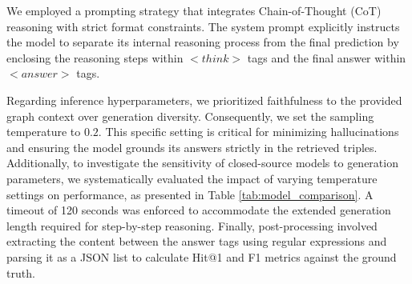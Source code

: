 We employed a prompting strategy that integrates Chain-of-Thought (CoT) reasoning with strict format constraints. The system prompt explicitly instructs the model to separate its internal reasoning process from the final prediction by enclosing the reasoning steps within $<think>$ tags and the final answer within $<answer>$ tags. 

Regarding inference hyperparameters, we prioritized faithfulness to the provided graph context over generation diversity. Consequently, we set the sampling temperature to $0.2$. This specific setting is critical for minimizing hallucinations and ensuring the model grounds its answers strictly in the retrieved triples. Additionally, to investigate the sensitivity of closed-source models to generation parameters, we systematically evaluated the impact of varying temperature settings on performance, as presented in Table \ref{tab:model_comparison}. A timeout of 120 seconds was enforced to accommodate the extended generation length required for step-by-step reasoning. Finally, post-processing involved extracting the content between the answer tags using regular expressions and parsing it as a JSON list to calculate Hit@1 and F1 metrics against the ground truth.

\begin{table}[htbp]
\centering
\caption{Comparison of the performance of different closed-source commercial models on the KGQA datasets under various temperature settings.}
\label{tab:model_comparison}
\small
{}
\end{table}


